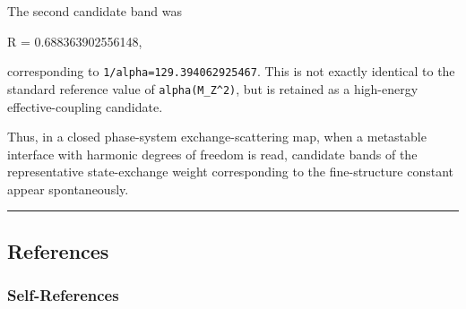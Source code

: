 \documentclass[
]{article}
\newenvironment{Shaded}{}{}
\newcommand{\NormalTok}[1]{#1}
\begin{document}
The second candidate band was

\begin{Shaded}
\begin{Highlighting}[]
\NormalTok{R = 0.688363902556148,}
\end{Highlighting}
\end{Shaded}

corresponding to \texttt{1/alpha=129.394062925467}. This is not exactly
identical to the standard reference value of \texttt{alpha(M\_Z\^{}2)},
but is retained as a high-energy effective-coupling candidate.

Thus, in a closed phase-system exchange-scattering map, when a
metastable interface with harmonic degrees of freedom is read, candidate
bands of the representative state-exchange weight corresponding to the
fine-structure constant appear spontaneously.

\begin{center}\rule{0.5\linewidth}{0.5pt}\end{center}

\subsection{References}\label{references}

\subsubsection{Self-References}\label{self-references}
\end{document}
